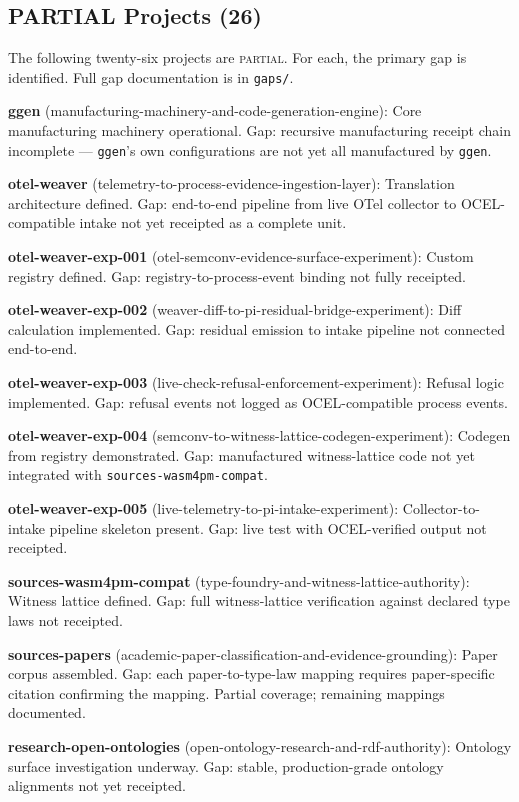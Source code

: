 \subsection{PARTIAL Projects (26)}

The following twenty-six projects are \textsc{partial}. For each, the primary gap is identified. Full gap documentation is in \texttt{gaps/}.

\textbf{ggen} (manufacturing-machinery-and-code-generation-engine): Core manufacturing machinery operational. Gap: recursive manufacturing receipt chain incomplete --- \texttt{ggen}'s own configurations are not yet all manufactured by \texttt{ggen}.

\textbf{otel-weaver} (telemetry-to-process-evidence-ingestion-layer): Translation architecture defined. Gap: end-to-end pipeline from live OTel collector to OCEL-compatible intake not yet receipted as a complete unit.

\textbf{otel-weaver-exp-001} (otel-semconv-evidence-surface-experiment): Custom registry defined. Gap: registry-to-process-event binding not fully receipted.

\textbf{otel-weaver-exp-002} (weaver-diff-to-pi-residual-bridge-experiment): Diff calculation implemented. Gap: residual emission to intake pipeline not connected end-to-end.

\textbf{otel-weaver-exp-003} (live-check-refusal-enforcement-experiment): Refusal logic implemented. Gap: refusal events not logged as OCEL-compatible process events.

\textbf{otel-weaver-exp-004} (semconv-to-witness-lattice-codegen-experiment): Codegen from registry demonstrated. Gap: manufactured witness-lattice code not yet integrated with \texttt{sources-wasm4pm-compat}.

\textbf{otel-weaver-exp-005} (live-telemetry-to-pi-intake-experiment): Collector-to-intake pipeline skeleton present. Gap: live test with OCEL-verified output not receipted.

\textbf{sources-wasm4pm-compat} (type-foundry-and-witness-lattice-authority): Witness lattice defined. Gap: full witness-lattice verification against declared type laws not receipted.

\textbf{sources-papers} (academic-paper-classification-and-evidence-grounding): Paper corpus assembled. Gap: each paper-to-type-law mapping requires paper-specific citation confirming the mapping. Partial coverage; remaining mappings documented.

\textbf{research-open-ontologies} (open-ontology-research-and-rdf-authority): Ontology surface investigation underway. Gap: stable, production-grade ontology alignments not yet receipted.

